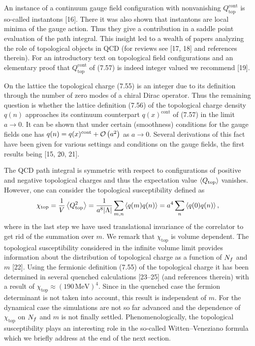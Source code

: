 An instance of a continuum gauge field configuration with nonvanishing
$Q^{\mathrm{cont}}_{\mathrm{top}}$ is so-called instantons [16]. There it was
also shown that instantons are local minima of the gauge action. Thus they
give a contribution in a saddle point evaluation of the path integral. This
insight led to a wealth of papers analyzing the role of topological objects in
QCD (for reviews see [17, 18] and references therein). For an introductory
text on topological field configurations and an elementary proof that
$Q^{\mathrm{cont}}_{\mathrm{top}}$ of (7.57) is indeed integer valued we
recommend [19].

On the lattice the topological charge (7.55) is an integer due to its
definition through the number of zero modes of a chiral Dirac operator. Thus
the remaining question is whether the lattice definition (7.56) of the
topological charge density $q(n)$ approaches its continuum counterpart
$q(x)^{\mathrm{cont}}$ of (7.57) in the limit $a \to 0$. It can be shown that
under certain (smoothness) conditions for the gauge fields one has
$q(n) = q(x)^{\mathrm{cont}} + \mathcal{O}\left(a^2\right)$ as $a \to 0$. Several derivations
of this fact have been given for various settings and conditions on the gauge
fields, the first results being [15, 20, 21].

The QCD path integral is symmetric with respect to configurations of positive
and negative topological charges and thus the expectation value
$\left\langle Q_{\mathrm{top}} \right\rangle$ vanishes. However, one can consider the topological
susceptibility defined as
\begin{equation}
  \chi_{\mathrm{top}} = \frac{1}{V}\left\langle Q_{\mathrm{top}}^2 \right\rangle
  = \frac{1}{a^8|\Lambda|}\sum_{m,n}\left\langle q(m)q(n) \right\rangle
  = a^4\sum_n \left\langle q(0)q(n) \right\rangle,
\end{equation}
where in the last step we have used translational invariance of the correlator
to get rid of the summation over $m$. We remark that $\chi_{\mathrm{top}}$ is
volume dependent. The topological susceptibility considered in the infinite
volume limit provides information about the distribution of topological charge
as a function of $N_f$ and $m$ [22]. Using the fermionic definition (7.55) of
the topological charge it has been determined in several quenched calculations
[23--25] (and references therein) with a result of
$\chi_{\mathrm{top}} \approx (190\,\mathrm{MeV})^4$. Since in the quenched case
the fermion determinant is not taken into account, this result is independent
of $m$. For the dynamical case the simulations are not so far advanced and the
dependence of $\chi_{\mathrm{top}}$ on $N_f$ and $m$ is not finally settled.
Phenomenologically, the topological susceptibility plays an interesting role
in the so-called Witten--Veneziano formula which we briefly address at the end
of the next section.

